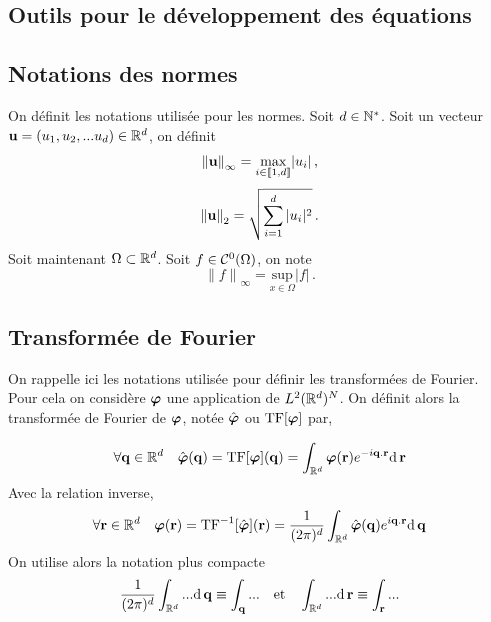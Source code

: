 \documentclass[10.5pt]{article}
\begin{document}
\begin{multicols}{2}
\section{Outils pour le développement des équations}

\label{ann:outils}


\subsection{Notations des normes}

On définit les notations utilisée pour les normes. Soit $d \in \mathbb{N}^*$. Soit un vecteur  ${\bf u} =(u_1, u_2, ... u_d) \in \mathbb{R}^d$, on définit
\begin{equation}
{\| {\bf u}\|}_\infty =  \underset{i \in  \llbracket 1,d \rrbracket }{\text{max}}{|u_i|}\, ,
\end{equation} 
\begin{equation}
{\| {\bf u}\|}_2 =  \sqrt{\sum_{i = 1}^{d} |u_i|^2} \, .
\end{equation}
Soit maintenant $\Omega \subset \mathbb{R}^d$. Soit $f \in \mathcal{C}^0(\Omega)$, on note
\begin{equation}
{\| f \|}_\infty =  \underset{x \in \Omega}{\text{sup}}{|f|} \, .
\end{equation} 



\subsection{Transformée de Fourier}

On rappelle ici les notations utilisée pour définir les transformées de Fourier. Pour cela on considère $\boldsymbol{ \varphi}$ une application de $L^2(\mathbb{R}^d)^N$. On définit alors la transformée de Fourier de $\boldsymbol{ \varphi}$, notée $\hat{\boldsymbol{ \varphi}}$ ou $\text{TF}[\boldsymbol{ \varphi}]$ par, 

\begin{equation}
  \forall {\bf q} \in \mathbb{R}^d \quad \hat{\boldsymbol{ \varphi}}({\bf q}) = \text{TF}[\boldsymbol{ \varphi}]({\bf q}) = \int_{\mathbb{R}^d} \boldsymbol{ \varphi}({\bf r}) e^{-i{\bf q}.{\bf r}}\text{d} \,{\bf r}
\end{equation}
Avec la relation inverse,
\begin{equation}
  \forall {\bf r} \in \mathbb{R}^d \quad \boldsymbol{ \varphi}({\bf r})  = \text{TF}^{-1}[\hat{\boldsymbol{ \varphi}}]({\bf r}) = \frac{1}{(2\pi)^d}\int_{\mathbb{R}^d} \hat{\boldsymbol{ \varphi}}({\bf q}) e^{i{\bf q}.{\bf r}}\text{d} \,{\bf q}
\end{equation}
On utilise alors la notation plus compacte 
\begin{equation}
  \frac{1}{(2\pi)^d}\int_{\mathbb{R}^d} ... \text{d} \,{\bf q} \equiv \int_{\bf q} ... \quad \text{et} \quad  \int_{\mathbb{R}^d} ... \text{d} \,{\bf r} \equiv \int_{\bf r} ... 
\end{equation}


\end{multicols}
\end{document}
